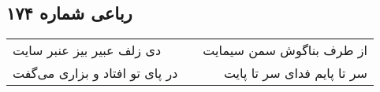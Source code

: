 \begin{center}
\section*{رباعی شماره ۱۷۴}
\label{sec:sh174}
\begin{longtable}{l p{0.5cm} r}
دی زلف عبیر بیز عنبر سایت
&&
از طرف بناگوش سمن سیمایت
\\
در پای تو افتاد و بزاری می‌گفت
&&
سر تا پایم فدای سر تا پایت
\\
\end{longtable}
\end{center}
